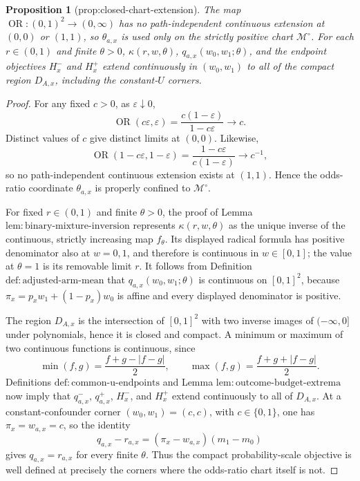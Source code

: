 \documentclass{article}
\newtheorem{proposition}{Proposition}
\begin{document}
\begin{proposition}[prop:closed-chart-extension]\label{prop:closed-chart-extension}
The map \(\operatorname{OR}:(0,1)^2\to(0,\infty)\) has no path-independent continuous extension at \((0,0)\) or \((1,1)\), so \(\theta_{a,x}\) is used only on the strictly positive chart \(\mathcal M^{\circ}\).  For each \(r\in(0,1)\) and finite \(\theta>0\), \(\kappa(r,w,\theta)\), \(q_{a,x}(w_0,w_1;\theta)\), and the endpoint objectives \(H_x^-\) and \(H_x^+\) extend continuously in \((w_0,w_1)\) to all of the compact region \(D_{A,x}\), including the constant-\(U\) corners.
\end{proposition}
\begin{proof}
For any fixed \(c>0\), as \(\varepsilon\downarrow0\),
\[
\operatorname{OR}(c\varepsilon,\varepsilon)
=\frac{c(1-\varepsilon)}{1-c\varepsilon}\longrightarrow c.
\]
Distinct values of \(c\) give distinct limits at \((0,0)\).  Likewise,
\[
\operatorname{OR}(1-c\varepsilon,1-\varepsilon)
=\frac{1-c\varepsilon}{c(1-\varepsilon)}\longrightarrow c^{-1},
\]
so no path-independent continuous extension exists at \((1,1)\).  Hence the odds-ratio coordinate \(\theta_{a,x}\) is properly confined to \(\mathcal M^\circ\).

For fixed \(r\in(0,1)\) and finite \(\theta>0\), the proof of Lemma \(\mathrm{lem{:}binary\text{-}mixture\text{-}inversion}\) represents \(\kappa(r,w,\theta)\) as the unique inverse of the continuous, strictly increasing map \(f_\theta\).  Its displayed radical formula has positive denominator also at \(w=0,1\), and therefore is continuous in \(w\in[0,1]\); the value at \(\theta=1\) is its removable limit \(r\).  It follows from Definition \(\mathrm{def{:}adjusted\text{-}arm\text{-}mean}\) that \(q_{a,x}(w_0,w_1;\theta)\) is continuous on \([0,1]^2\), because \(\pi_x=p_xw_1+(1-p_x)w_0\) is affine and every displayed denominator is positive.

The region \(D_{A,x}\) is the intersection of \([0,1]^2\) with two inverse images of \(({-}\infty,0]\) under polynomials, hence it is closed and compact.  A minimum or maximum of two continuous functions is continuous, since
\[
\min(f,g)=\frac{f+g-|f-g|}{2},
\qquad
\max(f,g)=\frac{f+g+|f-g|}{2}.
\]
Definitions \(\mathrm{def{:}common\text{-}u\text{-}endpoints}\) and Lemma \(\mathrm{lem{:}outcome\text{-}budget\text{-}extrema}\) now imply that \(q^-_{a,x}\), \(q^+_{a,x}\), \(H_x^-\), and \(H_x^+\) extend continuously to all of \(D_{A,x}\).  At a constant-confounder corner \((w_0,w_1)=(c,c)\), with \(c\in\{0,1\}\), one has \(\pi_x=w_{a,x}=c\), so the identity
\[
q_{a,x}-r_{a,x}=(\pi_x-w_{a,x})(m_1-m_0)
\]
gives \(q_{a,x}=r_{a,x}\) for every finite \(\theta\).  Thus the compact probability-scale objective is well defined at precisely the corners where the odds-ratio chart itself is not.
\end{proof}
\end{document}

